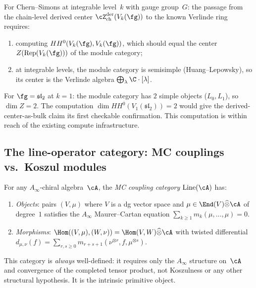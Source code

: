 \begin{remark}
\label{rem:checkable-bulk-computation}
For Chern--Simons at integrable level~$k$ with gauge group~$G$:
the passage from the chain-level derived center
$\cZ^{\mathrm{der}}_{\mathrm{ch}}(V_k(\fg))$ to the known
Verlinde ring requires:
\begin{enumerate}[label=\textup{(\roman*)}]
\item computing $HH^0(V_k(\fg), V_k(\fg))$, which should equal
  the center $Z(\operatorname{Rep}(V_k(\fg)))$ of the
  module category;
\item at integrable levels, the module category is semisimple
  (Huang--Lepowsky), so its center is the Verlinde algebra
  $\bigoplus_\lambda \C \cdot [\lambda]$.
\end{enumerate}
For $\fg = \mathfrak{sl}_2$ at $k = 1$: the module category has
$2$ simple objects ($L_0, L_1$), so $\dim Z = 2$.  The
computation $\dim HH^0(V_1(\mathfrak{sl}_2)) = 2$ would give
the derived-center-as-bulk claim its first checkable confirmation.
This computation is within reach of the existing compute
infrastructure.
\end{remark}

\subsection{The line-operator category: MC couplings vs.\ Koszul
  modules}
\label{subsec:line-mc-vs-koszul}

\begin{definition}
\label{def:mc-coupling-category}
For any $A_\infty$-chiral algebra~$\cA$, the \emph{MC coupling
category} $\operatorname{Line}(\cA)$ has:
\begin{enumerate}[label=\textup{(\alph*)}]
\item \emph{Objects}: pairs $(V, \mu)$ where $V$ is a dg vector
  space and $\mu \in \End(V) \widehat\otimes \cA$ of degree~$1$
  satisfies the $A_\infty$ Maurer--Cartan equation
  $\sum_{k \ge 1} m_k(\mu, \ldots, \mu) = 0$.

\item \emph{Morphisms}:
  $\Hom((V,\mu), (W,\nu))
  = \Hom(V, W) \widehat\otimes \cA$
  with twisted differential
  $d_{\mu,\nu}(f)
  = \sum_{r,s \ge 0} m_{r+s+1}(\nu^{\otimes r}, f,
  \mu^{\otimes s})$.
\end{enumerate}
This category is \emph{always} well-defined: it requires only the
$A_\infty$ structure on~$\cA$ and convergence of the completed
tensor product, not Koszulness or any other structural hypothesis.
It is the intrinsic primitive object.
\end{definition}

